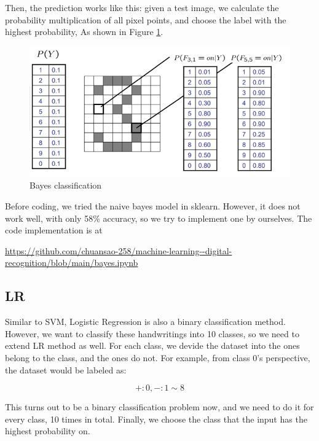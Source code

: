 \documentclass{article}
\begin{document}
	 Then, the prediction works like this: given a test image, we calculate the probability multiplication of all pixel points, and choose the label with the highest probability, As shown in Figure \ref{bayes}.
	 
	 \begin{figure}[htbp]
	 	\centering
	 	\includegraphics[scale=0.6]{1.png}
	 	\caption{Bayes classification}
	 	\label{bayes}
	 \end{figure}
	 
	 Before coding, we tried the naive bayes model in sklearn. However, it does not work well, with only 58\% accuracy, so we try to implement one by ourselves. The code implementation is at 
	 \begin{center}
	 	\url{https://github.com/chuansao-258/machine-learning--digital-recognition/blob/main/bayes.ipynb}
	 \end{center}
 	 
 	 \subsection{LR}
 	 
 	 Similar to SVM, Logistic Regression is also a binary classification method. However, we want to classify these handwritings into 10 classes, so we need to extend LR method as well. For each class, we devide the dataset into the ones belong to the class, and the ones do not. For example, from class $0$'s perspective, the dataset would be labeled as:
 	 
 	 \begin{equation}
 	 	+: 0, -: 1\sim 8
 	 \end{equation}
  
	This turns out to be a binary classification problem now, and we need to do it for every class, 10 times in total. Finally, we choose the class that the input has the highest probability on.
 	 
\end{document}
